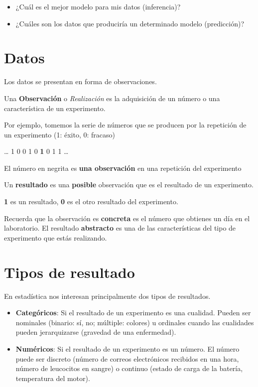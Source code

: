 \documentclass[
]{book}
\providecommand{\tightlist}{%
  \setlength{\itemsep}{0pt}\setlength{\parskip}{0pt}}
\begin{document}
\begin{itemize}
\tightlist
\item
  ¿Cuál es el mejor modelo para mis datos (inferencia)?
\item
  ¿Cuáles son los datos que produciría un determinado modelo (predicción)?
\end{itemize}

\hypertarget{datos}{%
\section{Datos}\label{datos}}

Los datos se presentan en forma de observaciones.

Una \textbf{Observación} o \emph{Realización} es la adquisición de un número o una característica de un experimento.

Por ejemplo, tomemos la serie de números que se producen por la repetición de un experimento (1: éxito, 0: fracaso)

\ldots{} 1 0 0 1 0 \textbf{1} 0 1 1 \ldots{}

El número en negrita es \textbf{una observación} en una repetición del experimento

Un \textbf{resultado} es una \textbf{posible} observación que es el resultado de un experimento.

\textbf{1} es un resultado, \textbf{0} es el otro resultado del experimento.

Recuerda que la observación es \textbf{concreta} es el número que obtienes un día en el laboratorio. El resultado \textbf{abstracto} es una de las características del tipo de experimento que estás realizando.

\hypertarget{tipos-de-resultado}{%
\section{Tipos de resultado}\label{tipos-de-resultado}}

En estadística nos interesan principalmente dos tipos de resultados.

\begin{itemize}
\item
  \textbf{Categóricos}: Si el resultado de un experimento es una cualidad. Pueden ser nominales (binario: sí, no; múltiple: colores) u ordinales cuando las cualidades pueden jerarquizarse (gravedad de una enfermedad).
\item
  \textbf{Numéricos}: Si el resultado de un experimento es un número. El número puede ser discreto (número de correos electrónicos recibidos en una hora, número de leucocitos en sangre) o continuo (estado de carga de la batería, temperatura del motor).
\end{itemize}
\end{document}

